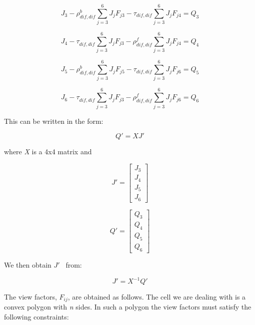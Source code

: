 \begin{equation}
{J_3} - \rho_{dif,dif}^b\sum\limits_{j = 3}^6 {{J_j}{F_{j3}} - {\tau_{dif,dif}}\sum\limits_{j = 3}^6 {{J_j}{F_{j4}} = {Q_3}} }
\end{equation}

\begin{equation}
{J_4} - \tau_{dif,dif}^{}\sum\limits_{j = 3}^6 {{J_j}{F_{j3}} - \rho_{dif,dif}^f\sum\limits_{j = 3}^6 {{J_j}{F_{j4}} = {Q_4}} }
\end{equation}

\begin{equation}
{J_5} - \rho_{dif,dif}^b\sum\limits_{j = 3}^6 {{J_j}{F_{j5}} - {\tau_{dif,dif}}\sum\limits_{j = 3}^6 {{J_j}{F_{j6}} = {Q_5}} }
\end{equation}

\begin{equation}
{J_6} - \tau_{dif,dif}^{}\sum\limits_{j = 3}^6 {{J_j}{F_{j3}} - \rho_{dif,dif}^f\sum\limits_{j = 3}^6 {{J_j}{F_{j6}} = {Q_6}} }
\end{equation}

This can be written in the form:

\begin{equation}
Q' = XJ'
\label{eq:QequalsXJprime}
\end{equation}

where \emph{X} is a 4x4 matrix and

\begin{equation}
J' = \left[ \begin{array}{c}
   J_3 \\
   J_4 \\
   J_5 \\
   J_6 \end{array} \right]
\end{equation}

\begin{equation}
Q' = \left[ \begin{array}{c}
    Q_3 \\
    Q_4 \\
    Q_5 \\
    Q_6 \end{array} \right]
\end{equation}

We then obtain \(J'\) ~from:

\begin{equation}
J' = {X^{ - 1}}Q'
\end{equation}

The view factors, \({F_{ij}}\), are obtained as follows. The cell we are dealing with is a convex polygon with \emph{n} sides. In such a polygon the view factors must satisfy the following constraints:

